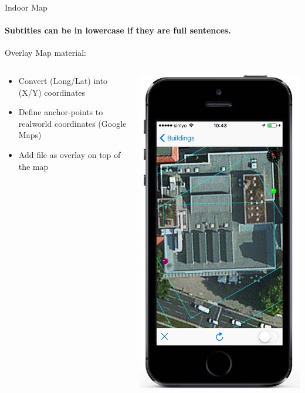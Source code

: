 \documentclass[11pt]{beamer}
\begin{document}
\begin{frame}{Indoor Map}

\framesubtitle{Subtitles can be in lowercase if they are full sentences.}
Overlay Map material:

  \begin{columns}[T]
  \begin{column}{.6\textwidth}
  \begin{itemize}
    \item Convert (Long/Lat) into (X/Y) coordinates
    \item Define anchor-points to realworld coordinates (Google Maps)
    \item Add file as overlay on top of the map
  \end{itemize}
  \end{column}
  \begin{column}{.4\textwidth}
  \includegraphics[scale=0.25]{mapfirststep}
  \end{column}
\end{columns}


\end{frame}
\end{document}
